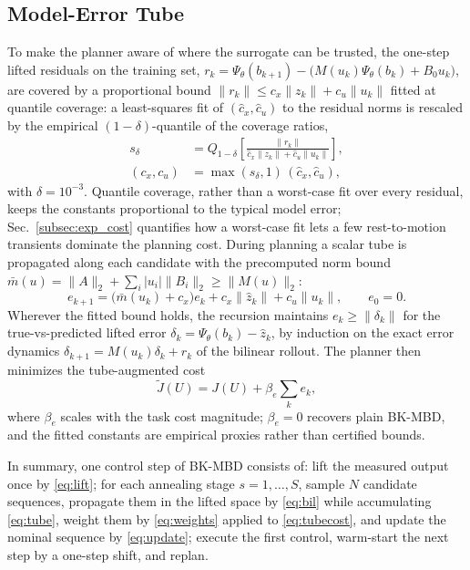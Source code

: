 \documentclass[lettersize,journal]{IEEEtran}
\theoremstyle{remark}
\newcommand{\bkmbd}{\textsc{BK-MBD}}
\begin{document}
\subsection{Model-Error Tube}\label{subsec:tube}

To make the planner aware of where the surrogate can be trusted, the
one-step lifted residuals on the training set,
$r_k = \Psi_\theta(b_{k+1}) - \big(M(u_k)\Psi_\theta(b_k) + B_0 u_k\big)$,
are covered by a proportional bound
$\|r_k\| \le c_x \|z_k\| + c_u \|u_k\|$ fitted at quantile coverage: a
least-squares fit of $(\hat c_x, \hat c_u)$ to the residual norms is
rescaled by the empirical $(1-\delta)$-quantile of the coverage ratios,
\begin{equation}
\begin{aligned}
s_\delta &= Q_{1-\delta}\!\left[
\frac{\|r_k\|}{\hat c_x \|z_k\| + \hat c_u \|u_k\|}
\right], \\
(c_x, c_u) &= \max(s_\delta, 1) \,(\hat c_x, \hat c_u),
\end{aligned}
\label{eq:tubefit}
\end{equation}
with $\delta = 10^{-3}$. Quantile coverage, rather than a worst-case fit
over every residual, keeps the constants proportional to the typical
model error; Sec.~\ref{subsec:exp_cost} quantifies how a worst-case fit
lets a few rest-to-motion transients dominate the planning cost.
During planning a scalar tube is propagated along each candidate with the
precomputed norm bound
$\bar m(u) = \|A\|_2 + \sum_i |u_i| \|B_i\|_2 \ge \|M(u)\|_2$:
\begin{equation}
e_{k+1} = \big(\bar m(u_k) + c_x\big) e_k
+ c_x \|\hat z_k\| + c_u \|u_k\|,
\qquad e_0 = 0 .
\label{eq:tube}
\end{equation}
Wherever the fitted bound holds, the recursion maintains
$e_k \ge \|\delta_k\|$ for the true-vs-predicted lifted error
$\delta_k = \Psi_\theta(b_k) - \hat z_k$, by induction on the exact error
dynamics $\delta_{k+1} = M(u_k)\delta_k + r_k$ of the bilinear rollout.
The planner then minimizes the tube-augmented cost
\begin{equation}
\tilde J(U) = J(U) + \beta_e \sum_{k} e_k ,
\label{eq:tubecost}
\end{equation}
where $\beta_e$ scales with the task cost magnitude; $\beta_e = 0$ recovers
plain \bkmbd{}, and the fitted constants are empirical proxies rather than
certified bounds.

In summary, one control step of \bkmbd{} consists of: lift the measured
output once by \eqref{eq:lift}; for each annealing stage
$s = 1, \dots, S$, sample $N$ candidate sequences, propagate them in the
lifted space by \eqref{eq:bil} while accumulating \eqref{eq:tube}, weight
them by \eqref{eq:weights} applied to \eqref{eq:tubecost}, and update the
nominal sequence by \eqref{eq:update}; execute the first control, warm-start
the next step by a one-step shift, and replan.
\end{document}
